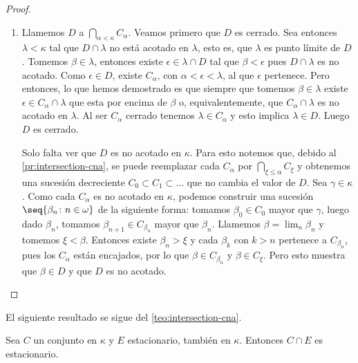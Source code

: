 \begin{proof}
\begin{enumerate}[label=\alph*)]
        \item Llamemos $D$ a $\dint_{\alpha<\kappa}C_\alpha$. Veamos primero que $D$ es cerrado.
            Sea entonces $\lambda<\kappa$ tal que $D\cap\lambda$
            no está acotado en $\lambda$, esto es, que $\lambda$ es punto límite de $D$.
            Tomemos $\beta\in\lambda$,
            entonces existe $\epsilon\in\lambda\cap D$ tal que $\beta<\epsilon$ pues
            $D\cap\lambda$ es no acotado.
            Como $\epsilon\in D$, existe $C_\alpha$, con $\alpha<\epsilon<\lambda$,
            al que $\epsilon$ pertenece.
            Pero entonces, lo que hemos demostrado es que siempre que tomemos $\beta\in\lambda$
            existe $\epsilon\in C_\alpha\cap\lambda$ que esta por encima de $\beta$ o, equivalentemente,
            que $C_\alpha\cap\lambda$ es no acotado en $\lambda$.
            Al ser $C_\alpha$ cerrado tenemos $\lambda\in C_\alpha$ y esto implica
            $\lambda\in D$. Luego $D$ es cerrado.

            Solo falta ver que $D$ es no acotado en $\kappa$.
            Para esto notemos que, debido al \cref{pr:intersection-cna},
            se puede reemplazar cada $C_\alpha$ por $\bigcap_{\xi\leq\alpha} C_\xi$
            y obtenemos una sucesión decreciente $C_0\subset C_1\subset\dots$
            que no cambia el valor de $D$.
            Sea $\gamma\in\kappa$. Como cada $C_\alpha$ es no acotado en $\kappa$,
            podemos construir una sucesión $\seq{\beta_n\colon n\in\omega}$ de la siguiente forma:
            tomamos $\beta_0\in C_0$ mayor que $\gamma$, luego dado $\beta_n$, tomamos
            $\beta_{n+1} \in C_{\beta_n}$ mayor que $\beta_n$. Llamemos $\beta = \lim_n\beta_n$
            y tomemos $\xi<\beta$. Entonces existe $\beta_n>\xi$ y cada $\beta_k$ con $k>n$
            pertenece a $C_{\beta_n}$, pues los $C_\alpha$ están encajados,
            por lo que $\beta\in C_{\beta_n}$ y $\beta\in C_\xi$.
            Pero esto muestra que $\beta\in D$ y que $D$ es no acotado.
    \end{enumerate}
\end{proof}

El siguiente resultado se sigue del \cref{teo:intersection-cna}.

\begin{cor}\label{cor:cna-stationary}
    Sea $C$ un conjunto \cna{} en $\kappa$ y $E$ estacionario, también en $\kappa$.
    Entonces $C\cap E$ es estacionario.
\end{cor}

